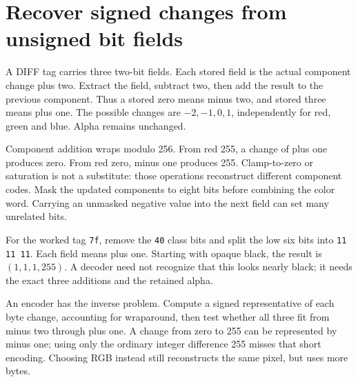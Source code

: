 \section{Recover signed changes from unsigned bit fields}
A DIFF tag carries three two-bit fields. Each stored field is the actual component
change plus two. Extract the field, subtract two, then add the result to the previous
component. Thus a stored zero means minus two, and stored three means plus one.
The possible changes are \(-2,-1,0,1\), independently for red, green and blue.
Alpha remains unchanged.

Component addition wraps modulo 256. From red 255, a change of plus one produces zero.
From red zero, minus one produces 255. Clamp-to-zero or saturation is not a substitute:
those operations reconstruct different component codes. Mask the updated components
to eight bits before combining the color word. Carrying an unmasked negative value
into the next field can set many unrelated bits.

For the worked tag \texttt{7f}, remove the \texttt{40} class bits and split the low
six bits into \texttt{11 11 11}. Each field means plus one. Starting with opaque black,
the result is \((1,1,1,255)\). A decoder need not recognize that this looks nearly black;
it needs the exact three additions and the retained alpha.

An encoder has the inverse problem. Compute a signed representative of each byte
change, accounting for wraparound, then test whether all three fit from minus two
through plus one. A change from zero to 255 can be represented by minus one; using
only the ordinary integer difference 255 misses that short encoding. Choosing RGB
instead still reconstructs the same pixel, but uses more bytes.
